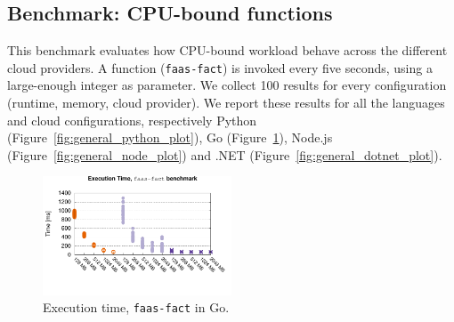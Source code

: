 \subsection{Benchmark: CPU-bound functions}
\label{sec:general_test}
This benchmark evaluates how CPU-bound workload behave across the different cloud providers.
A function (\texttt{faas-fact}) is invoked every five seconds, using a large-enough integer as parameter. 
We collect 100 results for every configuration (runtime, memory, cloud provider).
We report these results for all the languages and cloud configurations, respectively Python (Figure~\ref{fig:general_python_plot}), Go (Figure~\ref{fig:general_go_plot}), Node.js (Figure~\ref{fig:general_node_plot}) and .NET (Figure~\ref{fig:general_dotnet_plot}).


\begin{figure}[!t]
\centering
\includegraphics[width=0.5\textwidth, trim={0 40 0 0}]{bilder/general_go/cpufact.pdf}
\caption{Execution time, \texttt{faas-fact} in Go.}
\label{fig:general_go_plot}
\end{figure}

